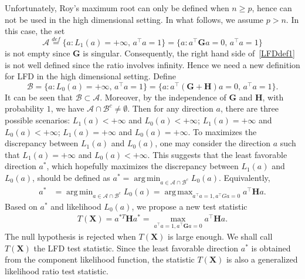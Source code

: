 \documentclass[12pt]{article} %
\DeclareMathOperator*{\argmax}{arg\,max}
\DeclareMathOperator*{\argmin}{arg\,min}
\newcommand{\bX}{\mathbf{X}}
\newcommand{\bH}{\mathbf{H}}
\newcommand{\bG}{\mathbf{G}}
\theoremstyle{definition}
\begin{document}
Unfortunately, Roy's maximum root can only be defined when $n\geq p$, hence can not be used in the high dimensional setting.
In what follows, we assume $p>n$.
In this case,
the set
$$\mathcal{A}\overset{def}{=}\{a:L_1(a)=+\infty, \, a^\top a=1\}=\{a:a^\top \bG a=0, \, a^\top a=1\}$$
is not empty since $\bG$ is singular. 
Consequently, the right hand side of~\eqref{LFDdef1} is not well defined since the ratio involves infinity.
Hence we need a new definition for LFD in the high dimensional setting.
Define
$$\mathcal{B}=\{a:L_0(a)=+\infty, \, a^\top a=1\}=\{a:a^\top (\bG+\bH)a= 0, \, a^\top a=1\}.$$
It can be seen that $\mathcal{B}\subset \mathcal{A}$.
Moreover, by the independence of $\bG$ and $\bH$, with probability $1$, we have $\mathcal{A}\cap \mathcal{B}^c\neq \emptyset$.
Then for any direction $a$, there are three possible scenarios: $L_1(a)<+\infty$ and $L_0(a)<+\infty$; $L_1(a)=+\infty$ and $L_0(a)<+\infty$; $L_1(a)=+\infty$ and $L_0(a)=+\infty$.
To maximizes the discrepancy between $L_1(a)$ and $L_0(a)$, one may consider the direction $a$ such that $L_1(a)=+\infty$ and $L_0(a)<+\infty$.
This suggests that the least favorable direction $a^*$, which hopefully maximizes the discrepancy between $L_1(a)$ and $L_0(a)$, should be defined as $a^* = \argmin_{a\in\mathcal{A}\cap\mathcal{B}^c} L_0 (a)$.
Equivalently,
$$
\begin{aligned}
    a^*&=\argmin_{a\in \mathcal{A}\cap\mathcal{B}^c} L_0(a) = \argmax_{a^\top a=1,a^\top Ga=0} {a^\top \bH a}.
\end{aligned}
$$
Based on $a^*$ and likelihood $L_0(a)$, we propose a new test statistic
\begin{equation*}
    \begin{aligned}
        T(\bX)=a^{*T} \bH a^*
        =
        \max_{a^\top a=1, a^\top \bG a=0} 
        a^\top \bH a.
    \end{aligned}
\end{equation*}
The null hypothesis is rejected when $T(\bX)$ is large enough.
We shall call $T(\bX)$ the LFD test statistic.
Since the least favorable direction $a^*$ is obtained from the component likelihood function, the statistic $T(\bX)$ is also a generalized likelihood ratio test statistic.
\end{document}
